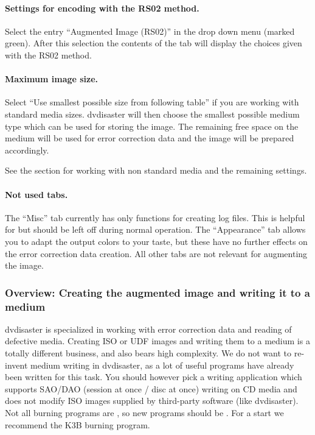 \vspace*{-3mm}
\paragraph{Settings for encoding with the RS02 method.}\quad

Select the entry ``Augmented Image (RS02)'' in the drop down
menu (marked green). After this selection the contents of the tab
will display the choices given with the RS02 method.

\paragraph{Maximum image size.} Select
``Use smallest possible size from following table'' if you are working
with standard media sizes. dvdisaster will then choose the
smallest possible medium type which can be used for
storing the image. The remaining free space on the medium
will be used for error correction data and the image will
be prepared accordingly.

See the  section
for working with non standard media and the remaining settings. 

\paragraph{Not used tabs.} The ``Misc'' tab currently has only
functions for creating log files. This is helpful for
but should be left off during normal operation.
The ``Appearance'' tab allows you to adapt the output colors
to your taste, but these have no further effects on the error correction data creation.
All other tabs are not relevant for augmenting the image.
 
\subsubsection{Overview: Creating the augmented image and writing it to a medium}
\label{howto-augment-overview}

dvdisaster is specialized in working with error correction data and reading
of defective media. Creating ISO or UDF images and writing them to a medium
is a totally different business, and also bears high complexity. We do not
want to re-invent medium writing in dvdisaster, as a lot of useful programs
have already been written for this task. You should however pick a writing
application which supports SAO/DAO (session at once / disc at once) writing
on CD media and does not modify ISO images supplied by third-party software
(like dvdisaster). Not all burning programs are , so new programs should be
. For a start we recommend the K3B burning program.


